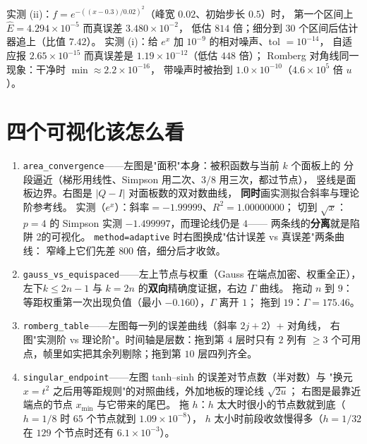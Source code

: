 实测 (ii)：$f=e^{-((x-0.3)/0.02)^2}$（峰宽 $0.02$、初始步长 $0.5$）时，
第一个区间上 $\widehat E=4.294\times10^{-5}$ 而真误差 $3.480\times10^{-2}$，
低估 $814$ 倍；细分到 $30$ 个区间后估计器追上（比值 $7.42$）。
实测 (i)：给 $e^x$ 加 $10^{-9}$ 的相对噪声、tol $=10^{-14}$，
自适应报 $2.65\times10^{-15}$ 而真误差是 $1.19\times10^{-12}$（低估 $448$ 倍）；
Romberg 对角线同一现象：干净时 $\min\approx2.2\times10^{-16}$，
带噪声时被抬到 $1.0\times10^{-10}$（$4.6\times10^{5}$ 倍 $u$）。

\section{四个可视化该怎么看}

\begin{enumerate}
  \item \texttt{area\_convergence}——左图是"面积"本身：被积函数与当前 $k$ 个面板上的
        分段逼近（梯形用线性、Simpson 用二次、$3/8$ 用三次，都过节点），
        竖线是面板边界。右图是 $|Q-I|$ 对面板数的双对数曲线，
        \textbf{同时}画实测拟合斜率与理论阶参考线。
        实测（$e^x$）：$\text{斜率}=-1.99999$、$R^2=1.00000000$；
        切到 $\sqrt x$：$p=4$ 的 Simpson 实测 $-1.499997$，而理论线仍是 $4$——
        两条线的\textbf{分离}就是陷阱 2的可视化。
        \texttt{method=adaptive} 时右图换成"估计误差 vs 真误差"两条曲线：
        窄峰上它们先差 $800$ 倍，细分后才收敛。
  \item \texttt{gauss\_vs\_equispaced}——左上节点与权重（Gauss 在端点加密、权重全正），
        左下$k\le2n-1$ 与 $k=2n$ 的\textbf{双向}精确度证据，右边 $\Gamma$ 曲线。
        拖动 $n$ 到 $9$：等距权重第一次出现负值（最小 $-0.160$），$\Gamma$ 离开 $1$；
        拖到 $19$：$\Gamma=175.46$。
  \item \texttt{romberg\_table}——左图每一列的误差曲线（斜率 $2j+2$）+ 对角线，
        右图"实测阶 vs 理论阶"。时间轴是层数：拖到第 $4$ 层时只有 $2$ 列有
        $\ge3$ 个可用点，帧里如实把其余列剔除；拖到第 $10$ 层四列齐全。
  \item \texttt{singular\_endpoint}——左图 tanh–sinh 的误差对节点数（半对数）与
        "换元 $x=t^2$ 之后用等距规则"的对照曲线，外加地板的理论线 $\sqrt{2u}$；
        右图是最靠近端点的节点 $x_{\min}$ 与它带来的尾巴。
        拖 $h$：$h$ 太大时很小的节点数就到底（$h=1/8$ 时 $65$ 个节点就到 $1.09\times10^{-8}$），
        $h$ 太小时前段收敛慢得多（$h=1/32$ 在 $129$ 个节点时还有 $6.1\times10^{-3}$）。
\end{enumerate}



